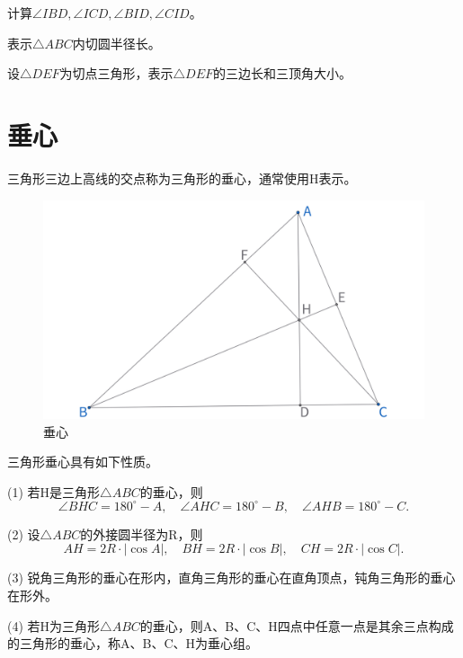 \begin{exercise}
    计算$\angle IBD, \angle ICD, \angle BID, \angle CID$。
\end{exercise}
\begin{exercise}
    表示$\triangle ABC$内切圆半径长。
\end{exercise}
\begin{exercise}
    设$\triangle DEF$为切点三角形，表示$\triangle DEF$的三边长和三顶角大小。
\end{exercise}


\newpage
\section{垂心}
\begin{definition}[垂心]
    三角形三边上高线的交点称为三角形的垂心，通常使用H表示。
\end{definition}

\begin{figure}[H]
    \centering
    \includegraphics[width=0.8\linewidth]{figures/三角形五心/垂心.png}
    \caption{垂心}
\end{figure}

\begin{proposition}[垂心性质]
    三角形垂心具有如下性质。

    (1) 若H是三角形$\triangle ABC$的垂心，则
    $$\angle BHC = 180^\circ - A,\quad \angle AHC = 180^\circ - B,\quad \angle AHB =180^\circ - C.$$

    (2) 设$\triangle ABC$的外接圆半径为R，则
    $$AH=2R\cdot |\cos A|,\quad
    BH=2R\cdot |\cos B|,\quad
    CH=2R\cdot |\cos C|.$$

    (3) 锐角三角形的垂心在形内，直角三角形的垂心在直角顶点，钝角三角形的垂心在形外。

    (4) 若H为三角形$\triangle ABC$的垂心，则A、B、C、H四点中任意一点是其余三点构成的三角形的垂心，称A、B、C、H为垂心组。
\end{proposition}


